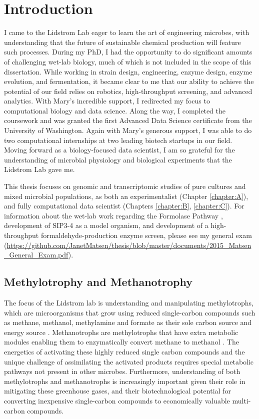 \chapter{Introduction}

I came to the Lidstrom Lab eager to learn the art of engineering microbes, with understanding that the future of sustainable chemical production will feature such processes.
During my PhD, I had the opportunity to do significant amounts of challenging wet-lab biology, much of which is not included in the scope of this dissertation.
While working in strain design, engineering, enzyme design, enzyme evolution, and fermentation, it became clear to me that our ability to achieve the potential of our field relies on robotics, high-throughput screening, and advanced analytics.
With Mary's incredible support, I redirected my focus to computational biology and data science.
Along the way, I completed the coursework and was granted the first Advanced Data Science certificate from the University of Washington.
Again with Mary's generous support, I was able to do two computational internships at two leading biotech startups in our field.
Moving forward as a biology-focused data scientist, I am so grateful for the understanding of microbial physiology and biological experiments that the Lidstrom Lab gave me.

This thesis focuses on genomic and transcriptomic studies of pure cultures and mixed microbial populations, as both an experimentalist (Chapter \ref{chapter:A}), and fully computational data scientist (Chapters \ref{chapter:B}, \ref{chapter:C}).
For information about the wet-lab work regarding the Formolase Pathway \cite{siegel2015}, development of SIP3-4 as a model organism, and development of a high-throughput formaldehyde-production enzyme screen, please see my general exam (\url{https://github.com/JanetMatsen/thesis/blob/master/documents/2015_Matsen_General_Exam.pdf}).

\section{Methylotrophy and Methanotrophy}
The focus of the Lidstrom lab is understanding and manipulating methylotrophs, which are microorganisms that grow using reduced single-carbon compounds such as methane, methanol, methylamine and formate as their sole carbon source and energy source \cite{anthony1982,mila2009}.
Methanotrophs are methylotrophs that have extra metabolic modules enabling them to enzymatically convert methane to methanol \cite{kalyuzhnaya2015puri}.
The energetics of activating these highly reduced single carbon compounds and the unique challenge of assimilating the activated products requires special metabolic pathways not present in other microbes.
Furthermore, understanding of both methylotrophs and methanotrophs is increasingly important given their role in mitigating these greenhouse gases, and their biotechnological potential for converting inexpensive single-carbon compounds to economically valuable multi-carbon compounds.

